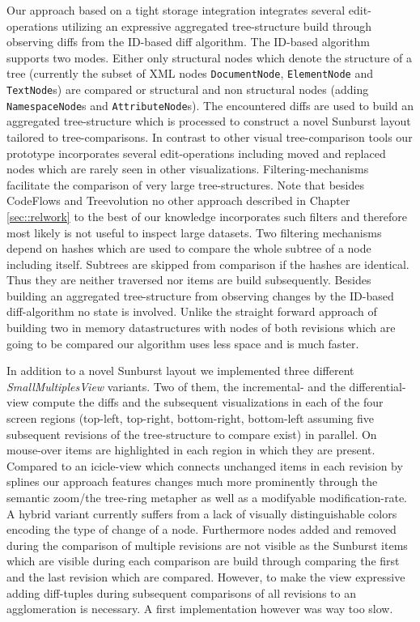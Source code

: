 Our approach based on a tight storage integration integrates several edit-operations utilizing an expressive aggregated tree-structure build through observing diffs from the ID-based diff algorithm. The ID-based algorithm supports two modes. Either only structural nodes which denote the structure of a tree (currently the subset of XML nodes \texttt{DocumentNode}, \texttt{ElementNode} and \texttt{TextNode}s) are compared or structural and non structural nodes (adding \texttt{NamespaceNode}s and \texttt{AttributeNode}s). The encountered diffs are used to build an aggregated tree-structure which is processed to construct a novel Sunburst layout tailored to tree-comparisons. In contrast to other visual tree-comparison tools our prototype incorporates several edit-operations including moved and replaced nodes which are rarely seen in other visualizations. Filtering-mechanisms facilitate the comparison of very large tree-structures. Note that besides CodeFlows\cite{} and Treevolution\cite{theron2006hierarchical} no other approach described in Chapter \ref{sec::relwork} to the best of our knowledge incorporates such filters and therefore most likely is not useful to inspect large datasets. Two filtering mechanisms depend on hashes which are used to compare the whole subtree of a node including itself. Subtrees are skipped from comparison if the hashes are identical. Thus they are neither traversed nor items are build subsequently. Besides building an aggregated tree-structure from observing changes by the ID-based diff-algorithm no state is involved. Unlike the straight forward approach of building two in memory datastructures with nodes of both revisions which are going to be compared our algorithm uses less space and is much faster. 

In addition to a novel Sunburst layout we implemented three different \emph{SmallMultiplesView} variants. Two of them, the incremental- and the differential-view compute the diffs and the subsequent visualizations in each of the four screen regions (top-left, top-right, bottom-right, bottom-left assuming five subsequent revisions of the tree-structure to compare exist) in parallel. On mouse-over items are highlighted in each region in which they are present. Compared to an icicle-view which connects unchanged items in each revision by splines our approach features changes much more prominently through the semantic zoom/the tree-ring metapher as well as a modifyable modification-rate. A hybrid variant currently suffers from a lack of visually distinguishable colors encoding the type of change of a node. Furthermore nodes added and removed during the comparison of multiple revisions are not visible as the Sunburst items which are visible during each comparison are build through comparing the first and the last revision which are compared. However, to make the view expressive adding diff-tuples during subsequent comparisons of all revisions to an agglomeration is necessary. A first implementation however was way too slow.

